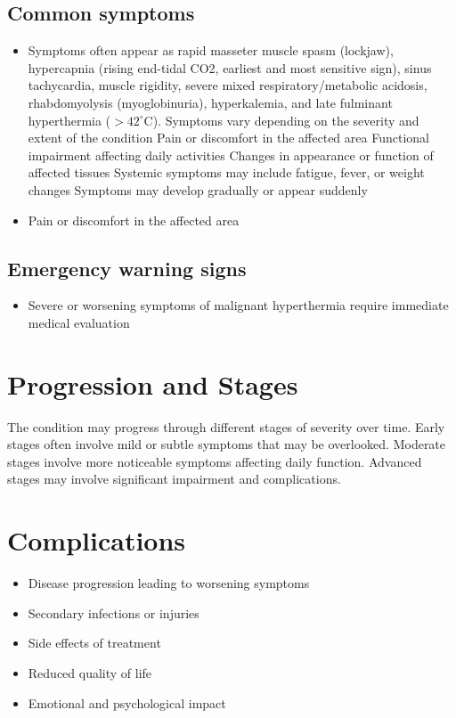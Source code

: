 \subsection{Common symptoms}
\begin{itemize}[noitemsep]
  \item Symptoms often appear as rapid masseter muscle spasm (lockjaw), hypercapnia (rising end-tidal CO2, earliest and most sensitive sign), sinus tachycardia, muscle rigidity, severe mixed respiratory/metabolic acidosis, rhabdomyolysis (myoglobinuria), hyperkalemia, and late fulminant hyperthermia ($>42^\circ\text{C}$). Symptoms vary depending on the severity and extent of the condition Pain or discomfort in the affected area Functional impairment affecting daily activities Changes in appearance or function of affected tissues Systemic symptoms may include fatigue, fever, or weight changes Symptoms may develop gradually or appear suddenly
  \item Pain or discomfort in the affected area
  \end{itemize}

\subsection{Emergency warning signs}
\begin{itemize}[noitemsep]
  \item Severe or worsening symptoms of malignant hyperthermia require immediate medical evaluation
\end{itemize}
\section{Progression and Stages}
The condition may progress through different stages of severity over time. Early stages often involve mild or subtle symptoms that may be overlooked. Moderate stages involve more noticeable symptoms affecting daily function. Advanced stages may involve significant impairment and complications.
\section{Complications}
\begin{itemize}[noitemsep]
  \item Disease progression leading to worsening symptoms
  \item Secondary infections or injuries
  \item Side effects of treatment
  \item Reduced quality of life
  \item Emotional and psychological impact
\end{itemize}
